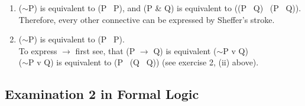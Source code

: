 \documentclass[a4paper,12pt]{article}
\newcommand{\mra}{$\rightarrow$ }
\newcommand{\ms}{$\sim$}
\newcommand{\tb}{\textbar \ }
\begin{document}
\begin{enumerate}[label=\arabic*,leftmargin=*]
\begin{enumerate}[label=(\roman*)]
            \end{enumerate}

        \item (\ms P) is equivalent to (P \tb P), and (P \& Q) is equivalent to ((P \tb Q) \tb (P \tb Q)). Therefore, every other connective can be expressed by Sheffer's stroke.

        \item (\ms P) is equivalent to (P \tb P).\\
            To express \mra first see, that (P \mra Q) is equivalent (\ms P v Q)\\
            (\ms P v Q) is equivalent to (P \tb (Q \tb Q)) (see exercise 2, (ii) above).

    \end{enumerate}

    \subsection*{Examination 2 in Formal Logic}
\end{document}

